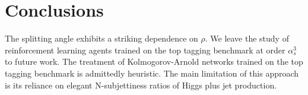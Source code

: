 \section{Conclusions}\label{sec:conclusions}

The splitting angle exhibits a striking dependence on $\rho$. We leave
the study of reinforcement learning agents trained on the top tagging
benchmark at order $\alpha_s^3$ to future work. The treatment of
Kolmogorov-Arnold networks trained on the top tagging benchmark is
admittedly heuristic. The main limitation of this approach is its
reliance on elegant N-subjettiness ratios of Higgs plus jet production.

